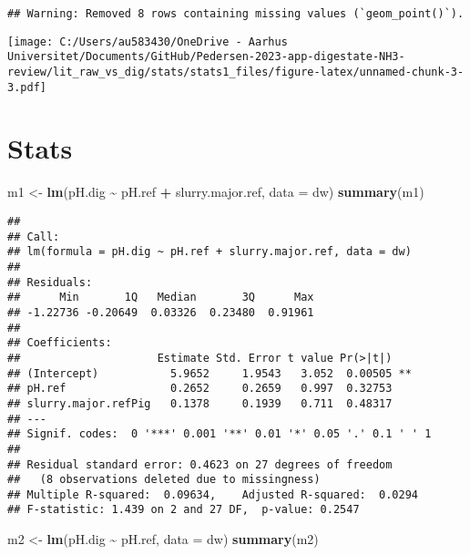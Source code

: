 \documentclass[
]{article}
\newenvironment{Shaded}{\begin{snugshade}}{\end{snugshade}}
\newcommand{\AttributeTok}[1]{\textcolor[rgb]{0.13,0.29,0.53}{#1}}
\newcommand{\FunctionTok}[1]{\textcolor[rgb]{0.13,0.29,0.53}{\textbf{#1}}}
\newcommand{\NormalTok}[1]{#1}
\newcommand{\OtherTok}[1]{\textcolor[rgb]{0.56,0.35,0.01}{#1}}
\newcommand{\SpecialCharTok}[1]{\textcolor[rgb]{0.81,0.36,0.00}{\textbf{#1}}}
\begin{document}
\begin{verbatim}
## Warning: Removed 8 rows containing missing values (`geom_point()`).
\end{verbatim}

\texttt{[image: C:/Users/au583430/OneDrive - Aarhus Universitet/Documents/GitHub/Pedersen-2023-app-digestate-NH3-review/lit\_raw\_vs\_dig/stats/stats1\_files/figure-latex/unnamed-chunk-3-3.pdf]}

\hypertarget{stats}{%
\section{Stats}\label{stats}}

\begin{Shaded}
\begin{Highlighting}[]
\NormalTok{m1 }\OtherTok{\textless{}{-}} \FunctionTok{lm}\NormalTok{(pH.dig }\SpecialCharTok{\textasciitilde{}}\NormalTok{ pH.ref }\SpecialCharTok{+}\NormalTok{ slurry.major.ref, }\AttributeTok{data =}\NormalTok{ dw)}
\FunctionTok{summary}\NormalTok{(m1)}
\end{Highlighting}
\end{Shaded}

\begin{verbatim}
## 
## Call:
## lm(formula = pH.dig ~ pH.ref + slurry.major.ref, data = dw)
## 
## Residuals:
##      Min       1Q   Median       3Q      Max 
## -1.22736 -0.20649  0.03326  0.23480  0.91961 
## 
## Coefficients:
##                     Estimate Std. Error t value Pr(>|t|)   
## (Intercept)           5.9652     1.9543   3.052  0.00505 **
## pH.ref                0.2652     0.2659   0.997  0.32753   
## slurry.major.refPig   0.1378     0.1939   0.711  0.48317   
## ---
## Signif. codes:  0 '***' 0.001 '**' 0.01 '*' 0.05 '.' 0.1 ' ' 1
## 
## Residual standard error: 0.4623 on 27 degrees of freedom
##   (8 observations deleted due to missingness)
## Multiple R-squared:  0.09634,    Adjusted R-squared:  0.0294 
## F-statistic: 1.439 on 2 and 27 DF,  p-value: 0.2547
\end{verbatim}

\begin{Shaded}
\begin{Highlighting}[]
\NormalTok{m2 }\OtherTok{\textless{}{-}} \FunctionTok{lm}\NormalTok{(pH.dig }\SpecialCharTok{\textasciitilde{}}\NormalTok{ pH.ref, }\AttributeTok{data =}\NormalTok{ dw)}
\FunctionTok{summary}\NormalTok{(m2)}
\end{Highlighting}
\end{Shaded}
\end{document}
